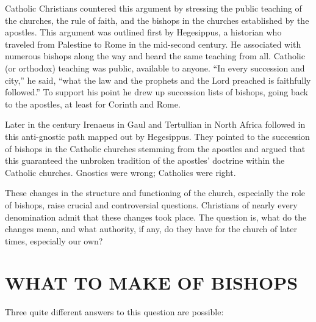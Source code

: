 Catholic Christians countered this argument by stressing the public teaching of the churches, the
rule of faith, and the bishops in the churches established by the apostles. This argument was
outlined first by Hegesippus, a historian who traveled from Palestine to Rome in the mid-second
century. He associated with numerous bishops along the way and heard the same teaching from all.
Catholic (or orthodox) teaching was public, available to anyone. “In every succession and city,” he
said, “what the law and the prophets and the Lord preached is faithfully followed.” To support his
point he drew up succession lists of bishops, going back to the apostles, at least for Corinth and
Rome.

Later in the century Irenaeus in Gaul and Tertullian in North Africa followed in this anti-gnostic
path mapped out by Hegesippus. They pointed to the succession of bishops in the Catholic churches
stemming from the apostles and argued that this guaranteed the unbroken tradition of the apostles’
doctrine within the Catholic churches. Gnostics were wrong; Catholics were right.

These changes in the structure and functioning of the church, especially the role of bishops, raise
crucial and controversial questions. Christians of nearly every denomination admit that these
changes took place. The question is, what do the changes mean, and what authority, if any, do they
have for the church of later times, especially our own?

\section{WHAT TO MAKE OF BISHOPS}

Three quite different answers to this question are possible:

